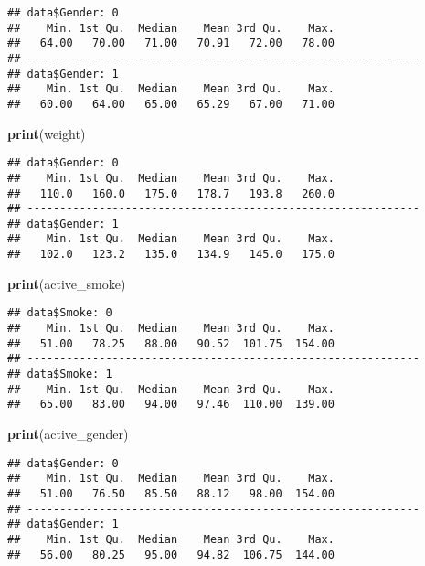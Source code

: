 \documentclass[
]{article}
\newenvironment{Shaded}{\begin{snugshade}}{\end{snugshade}}
\newcommand{\FunctionTok}[1]{\textcolor[rgb]{0.13,0.29,0.53}{\textbf{#1}}}
\newcommand{\NormalTok}[1]{#1}
\begin{document}
\begin{verbatim}
## data$Gender: 0
##    Min. 1st Qu.  Median    Mean 3rd Qu.    Max. 
##   64.00   70.00   71.00   70.91   72.00   78.00 
## ------------------------------------------------------------ 
## data$Gender: 1
##    Min. 1st Qu.  Median    Mean 3rd Qu.    Max. 
##   60.00   64.00   65.00   65.29   67.00   71.00
\end{verbatim}

\begin{Shaded}
\begin{Highlighting}[]
\FunctionTok{print}\NormalTok{(weight)}
\end{Highlighting}
\end{Shaded}

\begin{verbatim}
## data$Gender: 0
##    Min. 1st Qu.  Median    Mean 3rd Qu.    Max. 
##   110.0   160.0   175.0   178.7   193.8   260.0 
## ------------------------------------------------------------ 
## data$Gender: 1
##    Min. 1st Qu.  Median    Mean 3rd Qu.    Max. 
##   102.0   123.2   135.0   134.9   145.0   175.0
\end{verbatim}

\begin{Shaded}
\begin{Highlighting}[]
\FunctionTok{print}\NormalTok{(active\_smoke)}
\end{Highlighting}
\end{Shaded}

\begin{verbatim}
## data$Smoke: 0
##    Min. 1st Qu.  Median    Mean 3rd Qu.    Max. 
##   51.00   78.25   88.00   90.52  101.75  154.00 
## ------------------------------------------------------------ 
## data$Smoke: 1
##    Min. 1st Qu.  Median    Mean 3rd Qu.    Max. 
##   65.00   83.00   94.00   97.46  110.00  139.00
\end{verbatim}

\begin{Shaded}
\begin{Highlighting}[]
\FunctionTok{print}\NormalTok{(active\_gender)}
\end{Highlighting}
\end{Shaded}

\begin{verbatim}
## data$Gender: 0
##    Min. 1st Qu.  Median    Mean 3rd Qu.    Max. 
##   51.00   76.50   85.50   88.12   98.00  154.00 
## ------------------------------------------------------------ 
## data$Gender: 1
##    Min. 1st Qu.  Median    Mean 3rd Qu.    Max. 
##   56.00   80.25   95.00   94.82  106.75  144.00
\end{verbatim}
\end{document}
